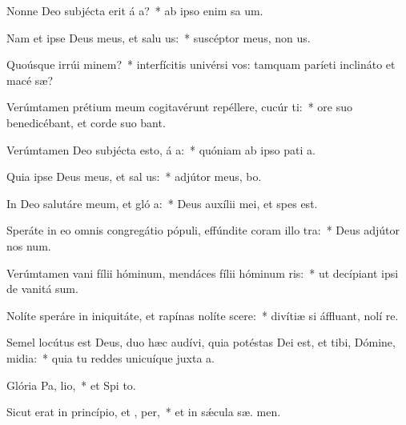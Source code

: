 \item Nonne Deo subjécta erit á a?~* ab ipso enim sa um.
\item Nam et ipse Deus meus, et salu us:~* suscéptor meus, non  us.
\item Quoúsque irrúi  minem?~* interfícitis univérsi vos: tamquam paríeti inclináto et macé sæ?
\item Verúmtamen prétium meum cogitavérunt repéllere, cucúr  ti:~* ore suo benedicébant, et corde suo bant.
\item Verúmtamen Deo subjécta esto, á a:~* quóniam ab ipso pati a.
\item Quia ipse Deus meus, et sal us:~* adjútor meus,  bo.
\item In Deo salutáre meum, et gló a:~* Deus auxílii mei, et spes    est.
\item Speráte in eo omnis congregátio pópuli, effúndite coram illo  tra:~* Deus adjútor nos  num.
\item Verúmtamen vani fílii hóminum, mendáces fílii hóminum  ris:~* ut decípiant ipsi de vanitá  sum.
\item Nolíte speráre in iniquitáte, et rapínas nolíte scere:~* divítiæ si áffluant, nolí  re.
\item Semel locútus est Deus, duo hæc audívi, quia potéstas Dei est, et tibi, Dómine, midia:~* quia tu reddes unicuíque juxta  a.
\item Glória Pa,  lio,~* et Spi to.
\item Sicut erat in princípio, et ,  per,~* et in sǽcula sæ. men.
